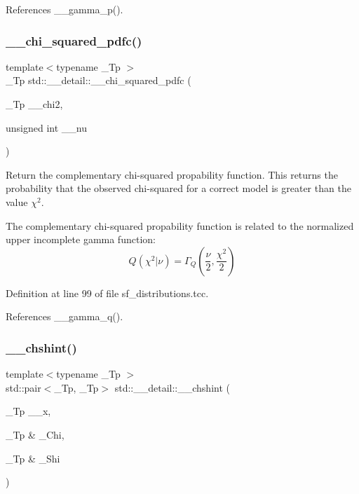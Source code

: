 References \+\_\+\+\_\+gamma\+\_\+p().

\mbox{\label{namespacestd_1_1____detail_aa62c16dd75a7411400c7082e6b2b246b}} 
\subsubsection{\texorpdfstring{\+\_\+\+\_\+chi\+\_\+squared\+\_\+pdfc()}{\_\_chi\_squared\_pdfc()}}
{\footnotesize\ttfamily template$<$typename \+\_\+\+Tp $>$ \\
\+\_\+\+Tp std\+::\+\_\+\+\_\+detail\+::\+\_\+\+\_\+chi\+\_\+squared\+\_\+pdfc (\begin{DoxyParamCaption}\item[{\+\_\+\+Tp}]{\+\_\+\+\_\+chi2,  }\item[{unsigned int}]{\+\_\+\+\_\+nu }\end{DoxyParamCaption})}



Return the complementary chi-\/squared propability function. This returns the probability that the observed chi-\/squared for a correct model is greater than the value $ \chi^2 $. 

The complementary chi-\/squared propability function is related to the normalized upper incomplete gamma function\+: \[ Q(\chi^2|\nu) = \Gamma_Q(\frac{\nu}{2}, \frac{\chi^2}{2}) \] 

Definition at line 99 of file sf\+\_\+distributions.\+tcc.



References \+\_\+\+\_\+gamma\+\_\+q().

\mbox{\label{namespacestd_1_1____detail_aa07abc4dac6cf589ccd12d3ce40277cf}} 
\subsubsection{\texorpdfstring{\+\_\+\+\_\+chshint()}{\_\_chshint()}}
{\footnotesize\ttfamily template$<$typename \+\_\+\+Tp $>$ \\
std\+::pair$<$\+\_\+\+Tp, \+\_\+\+Tp$>$ std\+::\+\_\+\+\_\+detail\+::\+\_\+\+\_\+chshint (\begin{DoxyParamCaption}\item[{\+\_\+\+Tp}]{\+\_\+\+\_\+x,  }\item[{\+\_\+\+Tp \&}]{\+\_\+\+Chi,  }\item[{\+\_\+\+Tp \&}]{\+\_\+\+Shi }\end{DoxyParamCaption})}



